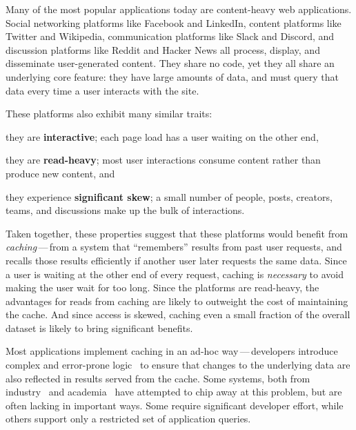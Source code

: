 Many of the most popular applications today are content-heavy web applications.
Social networking platforms like Facebook and LinkedIn, content platforms like
Twitter and Wikipedia, communication platforms like Slack and Discord, and
discussion platforms like Reddit and Hacker News all process, display, and
disseminate user-generated content. They share no code, yet they all share an
underlying core feature: they have large amounts of data, and must query that
data every time a user interacts with the site.

These platforms also exhibit many similar traits:
%
\begin{enumerate*}
  \item they are \textbf{interactive}; each page load has a user waiting on the
    other end,
  \item they are \textbf{read-heavy}; most user interactions consume content
    rather than produce new content, and
  \item they experience \textbf{significant skew}; a small number of people,
    posts, creators, teams, and discussions make up the bulk of interactions.
\end{enumerate*}
%
Taken together, these properties suggest that these platforms would benefit
from \emph{caching}\,---\,from a system that ``remembers'' results from past
user requests, and recalls those results efficiently if another user later
requests the same data. Since a user is waiting at the other end of every
request, caching is \emph{necessary} to avoid making the user wait for too long.
Since the platforms are read-heavy, the advantages for reads from caching are
likely to outweight the cost of maintaining the cache. And since access is
skewed, caching even a small fraction of the overall dataset is likely to bring
significant benefits.

Most applications implement caching in an ad-hoc way\,---\,developers introduce
complex and error-prone logic~\cite{ad-hoc-caching} to ensure that changes to
the underlying data are also reflected in results served from the cache. Some
systems, both from industry~\cite{facebook-memcache, tao, flannel} and
academia~\cite{txcache, cachegenie, casql-consistency-thesis, pequod} have
attempted to chip away at this problem, but are often lacking in important ways.
Some require significant developer effort, while others support only a
restricted set of application queries.

